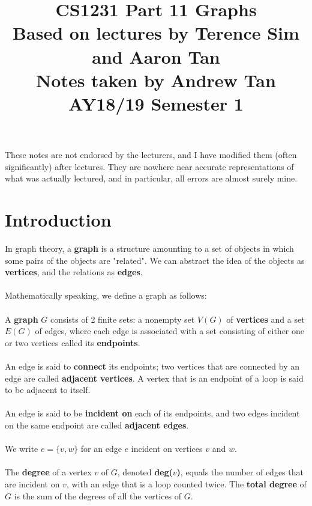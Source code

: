\documentclass[a4paper]{article}
\title{%
	CS1231 Part 11 Graphs  \\
	\large Based on lectures by Terence Sim and Aaron Tan
	\\ Notes taken by Andrew Tan
	\\ AY18/19 Semester 1
	\\ }
\author{}
\date{\vspace{-5ex}}
\begin{document}
\maketitle

\begin{center}\begin{minipage}[c]{0.9\textwidth}\centering\footnotesize These notes are not endorsed by the lecturers, and I have modified them (often significantly) after lectures. They are nowhere near accurate representations of what was actually lectured, and in particular, all errors are almost surely mine.\end{minipage}\end{center}

\section{Introduction}
In graph theory, a \textbf{graph} is a structure amounting to a set of objects in which some pairs of the objects are "related". We can abstract the idea of the objects as \textbf{vertices}, and the relations as \textbf{edges}.\\\\
Mathematically speaking, we define a graph as follows:\\\\
A \textbf{graph} $G$ consists of 2 finite sets: a nonempty set $V(G)$ of \textbf{vertices} and a set $E(G)$ of edges, where each edge is associated with a set consisting of either one or two vertices called its \textbf{endpoints}.\\\\
An edge is said to \textbf{connect} its endpoints; two vertices that are connected by an edge are called \textbf{adjacent vertices}. A vertex that is an endpoint of a loop is said to be adjacent to itself.\\\\
An edge is said to be \textbf{incident on} each of its endpoints, and two edges incident on the same endpoint are called \textbf{adjacent edges}.\\\\
We write $e=\{v,w\}$ for an edge $e$ incident on vertices $v$ and $w$.\\\\
The \textbf{degree} of a vertex $v$ of $G$, denoted \textbf{deg($v$)}, equals the number of edges that are incident on $v$, with an edge that is a loop counted twice. The \textbf{total degree} of $G$ is the sum of the degrees of all the vertices of $G$.\\\\
\end{document}
